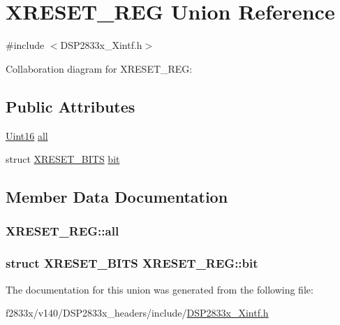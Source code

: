 \hypertarget{union_x_r_e_s_e_t___r_e_g}{}\section{X\+R\+E\+S\+E\+T\+\_\+\+R\+E\+G Union Reference}
\label{union_x_r_e_s_e_t___r_e_g}


{\ttfamily \#include $<$D\+S\+P2833x\+\_\+\+Xintf.\+h$>$}



Collaboration diagram for X\+R\+E\+S\+E\+T\+\_\+\+R\+E\+G\+:
\subsection*{Public Attributes}
\begin{DoxyCompactItemize}
\item 
\hyperlink{_d_s_p2833x___device_8h_a59a9f6be4562c327cbfb4f7e8e18f08b}{Uint16} \hyperlink{union_x_r_e_s_e_t___r_e_g_afa49a3be20fec7dad9f47784cea95578}{all}
\item 
struct \hyperlink{struct_x_r_e_s_e_t___b_i_t_s}{X\+R\+E\+S\+E\+T\+\_\+\+B\+I\+T\+S} \hyperlink{union_x_r_e_s_e_t___r_e_g_a688c2a51e8c8067b2c314f8f1a548fbd}{bit}
\end{DoxyCompactItemize}


\subsection{Member Data Documentation}
\hypertarget{union_x_r_e_s_e_t___r_e_g_afa49a3be20fec7dad9f47784cea95578}{}
\subsubsection[{all}]{ X\+R\+E\+S\+E\+T\+\_\+\+R\+E\+G\+::all}\label{union_x_r_e_s_e_t___r_e_g_afa49a3be20fec7dad9f47784cea95578}
\hypertarget{union_x_r_e_s_e_t___r_e_g_a688c2a51e8c8067b2c314f8f1a548fbd}{}
\subsubsection[{bit}]{\setlength{\rightskip}{0pt plus 5cm}struct {\bf X\+R\+E\+S\+E\+T\+\_\+\+B\+I\+T\+S} X\+R\+E\+S\+E\+T\+\_\+\+R\+E\+G\+::bit}\label{union_x_r_e_s_e_t___r_e_g_a688c2a51e8c8067b2c314f8f1a548fbd}


The documentation for this union was generated from the following file\+:\begin{DoxyCompactItemize}
\item 
f2833x/v140/\+D\+S\+P2833x\+\_\+headers/include/\hyperlink{_d_s_p2833x___xintf_8h}{D\+S\+P2833x\+\_\+\+Xintf.\+h}\end{DoxyCompactItemize}
